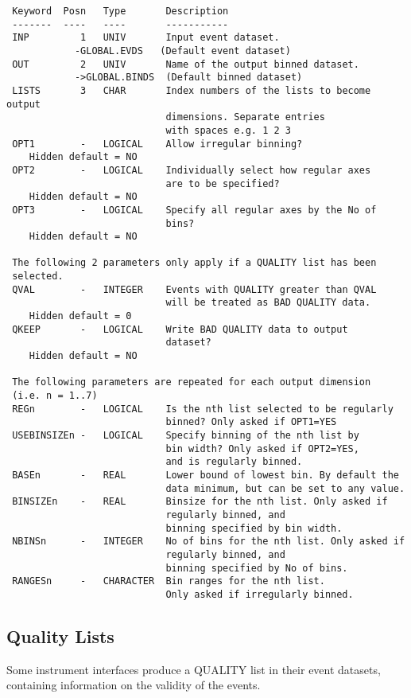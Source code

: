 \documentclass{book}
\renewcommand{\_}{{\tt\char'137}}     %
\begin{document}
\begin{verbatim}
 Keyword  Posn   Type       Description
 -------  ----   ----       -----------
 INP         1   UNIV       Input event dataset.
            -GLOBAL.EVDS   (Default event dataset)
 OUT         2   UNIV       Name of the output binned dataset.
            ->GLOBAL.BINDS  (Default binned dataset)
 LISTS       3   CHAR       Index numbers of the lists to become output
                            dimensions. Separate entries
                            with spaces e.g. 1 2 3
 OPT1        -   LOGICAL    Allow irregular binning?
    Hidden default = NO
 OPT2        -   LOGICAL    Individually select how regular axes
                            are to be specified?
    Hidden default = NO
 OPT3        -   LOGICAL    Specify all regular axes by the No of
                            bins?
    Hidden default = NO

 The following 2 parameters only apply if a QUALITY list has been
 selected.
 QVAL        -   INTEGER    Events with QUALITY greater than QVAL
                            will be treated as BAD QUALITY data.
    Hidden default = 0
 QKEEP       -   LOGICAL    Write BAD QUALITY data to output
                            dataset?
    Hidden default = NO

 The following parameters are repeated for each output dimension
 (i.e. n = 1..7)
 REGn        -   LOGICAL    Is the nth list selected to be regularly
                            binned? Only asked if OPT1=YES
 USEBINSIZEn -   LOGICAL    Specify binning of the nth list by
                            bin width? Only asked if OPT2=YES,
                            and is regularly binned.
 BASEn       -   REAL       Lower bound of lowest bin. By default the
                            data minimum, but can be set to any value.
 BINSIZEn    -   REAL       Binsize for the nth list. Only asked if
                            regularly binned, and
                            binning specified by bin width.
 NBINSn      -   INTEGER    No of bins for the nth list. Only asked if
                            regularly binned, and
                            binning specified by No of bins.
 RANGESn     -   CHARACTER  Bin ranges for the nth list.
                            Only asked if irregularly binned.

\end{verbatim}\subsection{Quality Lists}
Some instrument interfaces produce a QUALITY list in their event
datasets, containing information on the validity of the events.
\end{document}
